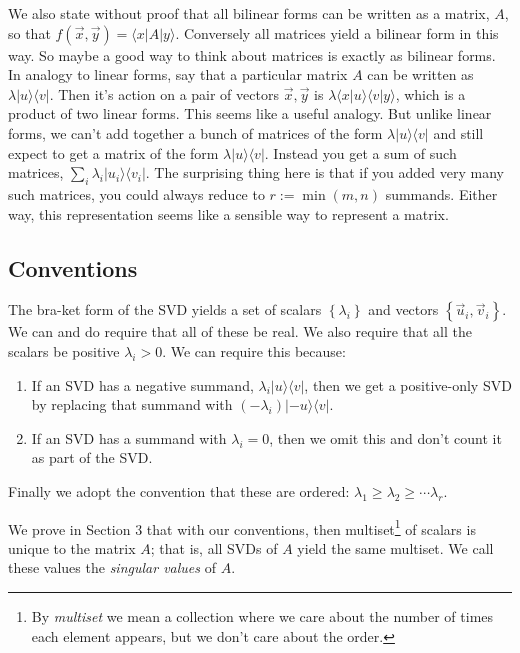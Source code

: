 \documentclass{amsbook}
\begin{document}
We also state without proof that all bilinear forms can be written as a matrix, $A$, so that $f\left(\vec x, \vec y\right)=\langle x|A|y\rangle$.  Conversely all matrices yield a bilinear form in this way.  So maybe a good way to think about matrices is exactly as bilinear forms.  In analogy to linear forms, say that a particular matrix $A$ can be written as $\lambda|u\rangle\langle v|$.  Then it's action on a pair of vectors $\vec x,\vec y$ is $\lambda\langle x|u\rangle\langle v|y\rangle$, which is a product of two linear forms.  This seems like a useful analogy.  But unlike linear forms, we can't add together a bunch of matrices of the form $\lambda|u\rangle\langle v|$ and still expect to get a matrix of the form $\lambda|u\rangle\langle v|$.  Instead you get a sum of such matrices, $\sum_i\lambda_i|u_i\rangle\langle v_i|$.  The surprising thing here is that if you added very many such matrices, you could always reduce to $r:=\min(m, n)$ summands.  Either way, this representation seems like a sensible way to represent a matrix.

\subsection{Conventions}

The bra-ket form of the SVD yields a set of scalars $\left\{\lambda_i\right\}$ and vectors $\left\{\vec u_i, \vec v_i\right\}$.  We can and do require that all of these be real.  We also require that all the scalars be positive $\lambda_i>0$.  We can require this because:

\begin{enumerate}
\item If an SVD has a negative summand, $\lambda_i|u\rangle\langle v|$, then we get a positive-only SVD by replacing that summand with $(-\lambda_i)|-u\rangle\langle v|$.
\item If an SVD has a summand with $\lambda_i=0$, then we omit this and don't count it as part of the SVD.
\end{enumerate}

Finally we adopt the convention that these are ordered:  $\lambda_1\geq\lambda_2\geq\cdots\lambda_r$.

We prove in Section 3 that with our conventions, then multiset\footnote{By {\em multiset} we mean a collection where we care about the number of times each element appears, but we don't care about the order.} of scalars is unique to the matrix $A$; that is, all SVDs of $A$ yield the same multiset.  We call these values the {\em singular values} of $A$.
\end{document}
